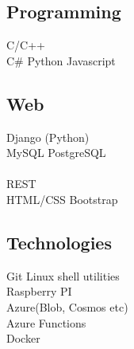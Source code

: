 \documentclass[]{deedy-resume-openfont}
\begin{document}
\begin{minipage}[t]{0.30\textwidth}
\subsection{Programming}
\textbullet{}   C/C++  \\
\textbullet{} C\# 
\textbullet{} Python 
\textbullet{} Javascript 

\sectionsep

\subsection{Web}
\textbullet{} Django (Python) \\ \textbullet{} MySQL 
\textbullet{} PostgreSQL \\  \\ \textbullet{} REST \\ 
\textbullet{} HTML/CSS \textbullet{} Bootstrap \\ 
\sectionsep

\subsection{Technologies}
\textbullet{} Git \textbullet{} Linux shell utilities \\
\textbullet{} Raspberry PI \\
\textbullet{} Azure(Blob, Cosmos etc) \\
\textbullet{} Azure Functions \\
\textbullet{} Docker  \\
\textbullet{}  \\

\sectionsep





%
%

\end{minipage} 
\end{document}
